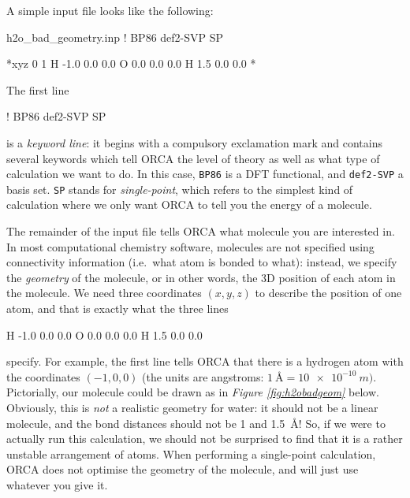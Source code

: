 \documentclass[10pt]{article}
\newcommand{\figref}[1]{\textit{Figure \ref{fig:#1}}}
\begin{document}
A simple input file looks like the following:

\begin{script}{h2o\_bad\_geometry.inp}
! BP86 def2-SVP SP

*xyz 0 1
H -1.0 0.0 0.0
O  0.0 0.0 0.0
H  1.5 0.0 0.0
*
\end{script}

The first line

\begin{cmdline}
! BP86 def2-SVP SP
\end{cmdline}

is a \textit{keyword line}: it begins with a compulsory exclamation mark and contains several keywords which tell ORCA the level of theory as well as what type of calculation we want to do. In this case, \texttt{BP86} is a DFT functional, and \texttt{def2-SVP} a basis set. \texttt{SP} stands for \textit{single-point}, which refers to the simplest kind of calculation where we only want ORCA to tell you the energy of a molecule.

The remainder of the input file tells ORCA what molecule you are interested in. In most computational chemistry software, molecules are not specified using connectivity information (i.e.\ what atom is bonded to what): instead, we specify the \textit{geometry} of the molecule, or in other words, the 3D position of each atom in the molecule. We need three coordinates \((x, y, z)\) to describe the position of one atom, and that is exactly what the three lines

\begin{cmdline}
H -1.0 0.0 0.0
O  0.0 0.0 0.0
H  1.5 0.0 0.0
\end{cmdline}

specify. For example, the first line tells ORCA that there is a hydrogen atom with the coordinates \((-1, 0, 0)\) (the units are angstroms: \(\SI{1}{\angstrom} = \SI{10e-10}{m})\). Pictorially, our molecule could be drawn as in \figref{h2obadgeom} below. Obviously, this is \textit{not} a realistic geometry for water: it should not be a linear molecule, and the  bond distances should not be 1 and \SI{1.5}{\angstrom}! So, if we were to actually run this calculation, we should not be surprised to find that it is a rather unstable arrangement of atoms. When performing a single-point calculation, ORCA does not optimise the geometry of the molecule, and will just use whatever you give it.
\end{document}
